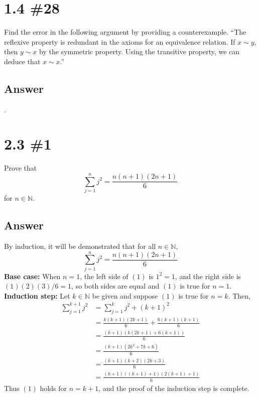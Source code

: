 \documentclass[
	12pt, %
]{fphw}
\newcommand\qed{\text{$\blacksquare$}}
\newcommand\N{\mathbb{N}}
\begin{document}
\section*{1.4 \#28}

\begin{problem}
Find the error in the following argument by providing a counterexample. “The reflexive property is redundant in the axioms for an
equivalence relation. If $x \sim y$, then $y \sim x$ by the symmetric property. Using the transitive property, we can deduce that $x \sim x$.”
\end{problem}


\subsection*{Answer} .\\



\newpage
\section*{2.3 \#1}

\begin{problem}
Prove that
$$
\sum_{j = 1}^n j^2 = \frac{n(n+1)(2n+1)}{6}
$$
for $n \in \N{}$.
\end{problem}


\subsection*{Answer} By induction, it will be demonstrated that for all $n \in \N{}$,
\begin{equation} \label{eq1}
\sum_{j = 1}^n j^2 = \frac{n(n+1)(2n+1)}{6}
\end{equation}
\textbf{Base case:} When $n = 1$, the left side of $(1)$ is $1^2 = 1$, and the right side is $(1)(2)(3)/6 = 1$, so both sides are equal and $(1)$ is true for $n=1$.\\
\textbf{Induction step:} Let $k \in \N{}$ be given and suppose $(1)$ is true for $n = k$. Then,
\begin{align*}
\sum_{j = 1}^{k+1} j^2 &= \sum_{j = 1}^{k} j^2 + (k + 1)^2\\
&=\frac{k(k+1)(2k+1)}{6} + \frac{6(k + 1)(k + 1)}{6}\\
&=\frac{(k+1)(k(2k+1)+6(k+1))}{6}\\
&=\frac{(k+1)(2k^2+7k + 6)}{6}\\
&=\frac{(k+1)(k+2)(2k+3)}{6}\\
&=\frac{(k+1)((k+1)+1)(2(k+1) + 1)}{6}
\end{align*}
Thus $(1)$ holds for $n = k + 1$, and the proof of the induction step is complete. \qed
\newpage
\end{document}
